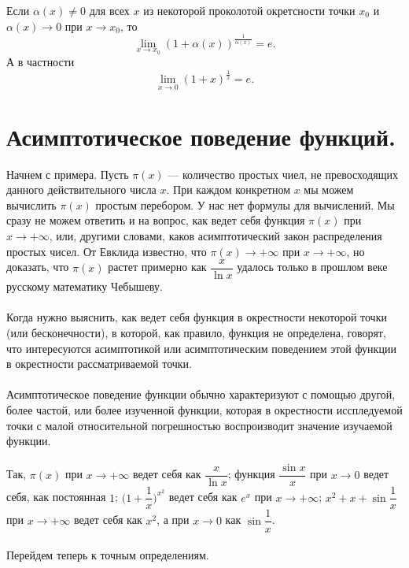 \begin{corollary}
	Если $\alpha(x) \ne 0$ для всех $x$ из некоторой проколотой окретсности точки $x_0$ и $\alpha(x)\to 0$ при $x\to x_0$, то 
	$$\lim\limits_{x\to x_0}(1 + \alpha(x))^{\frac{1}{\alpha(x)}} = e.$$
	А в частности 
	$$\lim\limits_{x\to 0}(1 + x)^{\frac{1}{x}} = e.$$
\end{corollary}
\section{Асимптотическое поведение функций.}
Начнем с примера. Пусть $\pi (x)$ --- количество простых чиел, не превосходящих данного действительного числа $x$. При каждом конкретном $x$ мы можем вычислить $\pi (x)$ простым перебором. У нас нет формулы для вычислений. Мы сразу не можем ответить и на вопрос, как ведет себя функция $\pi (x)$ при $x\to +\infty$, или, другими словами, каков асимптотический закон распределения простых чисел. От Евклида известно, что $\pi(x) \to +\infty$ при $x \to +\infty$, но доказать, что $\pi (x)$ растет примерно как $\dfrac{x}{\ln x}$ удалось только в прошлом веке русскому математику Чебышеву.\\\\
Когда нужно выяснить, как ведет себя функция в окрестности некоторой точки (или бесконечности), в которой, как правило, функция не определена, говорят, что интересуются асимптотикой или асимптотическим поведением этой функции в окрестности рассматриваемой точки.\\\\
Асимптотическое поведение функции обычно характеризуют с помощью другой, более частой, или более изученной функции, которая в окрестности исспледуемой точки с малой относительной погрешностью воспроизводит значение изучаемой функции.\\\\
Так, $\pi (x)$ при $x \to +\infty$ ведет себя как $\dfrac{x}{\ln x}$; функция $\dfrac{\sin x}{x}$ при $x \to 0$ ведет себя, как постоянная $1$; $\Big(1 + \dfrac{1}{x}\Big)^{x^2}$ ведет себя как $e^x$ при $x \to +\infty$; $x^2 + x + \sin \dfrac{1}{x}$ при $x \to +\infty$ ведет себя как $x^2$, а при $x \to 0$ как $\sin \dfrac{1}{x}$.\\\\
Перейдем теперь к точным определениям.
